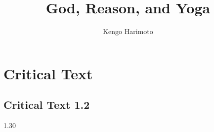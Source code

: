 \documentclass[a4paper,10pt,showtrims]{memoir} %
\title{God, Reason, and Yoga}
\author{Kengo Harimoto}
\begin{document}
\frontmatter

\begin{titlingpage}
% 
\end{titlingpage}
\firmlists
{}
\cleardoublepage
\tableofcontents
% 
% 

\mainmatter
\let\oldfootnoterule\footnoterule
\renewcommand*{\footnoterule}{}

\firmlists
\pagestyle{yvibook}
\renewcommand{\rightmark}{\MakeUppercase{General Introduction}}
% 
% 

\newcommand{\starteditionchapter}{
  \begin{sanskrit}%
	\begin{Spacing}{1.30}%
}
\newcommand{\finisheditionchapter}{%
  \end{Spacing}%
  \end{sanskrit}%
  \begin{english}%
  \end{english}%
}

\part{Critical Text}\renewcommand{\leftmark}{\MakeUppercase{[Critical Text}}
% 



\chapter{Critical Text 1.2}%
\renewcommand{\rightmark}{\MakeUppercase{1.2]}}
\starteditionchapter

\finisheditionchapter
\end{document}
